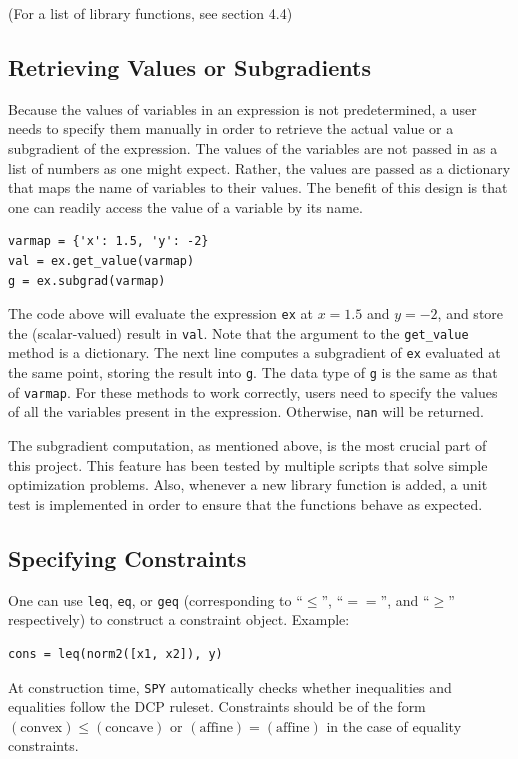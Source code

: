 \documentclass[12pt]{article}
\begin{document}
(For a list of library functions, see section 4.4)

\subsection{Retrieving Values or Subgradients}
Because the values of variables in an expression is not predetermined, a user needs to specify them manually in order to retrieve the actual value or a subgradient of the expression. The values of the variables are not passed in as a list of numbers as one might expect. Rather, the values are passed as a dictionary that maps the name of variables to their values. The benefit of this design is that one can readily access the value of a variable by its name.

\begin{verbatim}
varmap = {'x': 1.5, 'y': -2}
val = ex.get_value(varmap)
g = ex.subgrad(varmap)
\end{verbatim}

The code above will evaluate the expression \verb'ex' at $x=1.5$ and $y=-2$, and store the (scalar-valued) result in \verb'val'. Note that the argument to the \verb'get_value' method is a dictionary. The next line computes a subgradient of \verb'ex' evaluated at the same point, storing the result into \verb'g'. The data type of \verb'g' is the same as that of \verb'varmap'. For these methods to work correctly, users need to specify the values of all the variables present in the expression. Otherwise, \verb'nan' will be returned.

The subgradient computation, as mentioned above, is the most crucial part of this project. This feature has been tested by multiple scripts that solve simple optimization problems. Also, whenever a new library function is added, a unit test is implemented in order to ensure that the functions behave as expected.

\subsection{Specifying Constraints}
One can use \verb'leq', \verb'eq', or \verb'geq' (corresponding to 
``$\le$'', ``$==$'', and  ``$\ge$'' respectively) to construct a constraint
object. Example:

\begin{verbatim}
cons = leq(norm2([x1, x2]), y)
\end{verbatim}

At construction time, \verb'SPY' automatically checks whether inequalities
and equalities follow the DCP ruleset. Constraints should be of the form
$(\mbox{convex}) \le (\mbox{concave})$ or 
$(\mbox{affine}) = (\mbox{affine})$ in the case of equality constraints.
\end{document}
